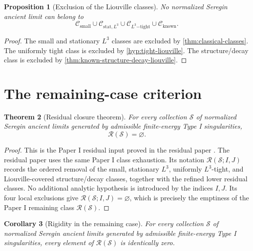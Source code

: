 \documentclass[11pt]{amsart}
\theoremstyle{plain}
\newtheorem{theorem}{Theorem}[section]
\newtheorem{proposition}[theorem]{Proposition}
\newtheorem{corollary}[theorem]{Corollary}
\theoremstyle{definition}
\theoremstyle{remark}
\numberwithin{equation}{section}
\newcommand{\calS}{\mathcal S}
\newcommand{\calR}{\mathcal R}
\newcommand{\calC}{\mathcal C}
\begin{document}
\begin{proposition}[Exclusion of the Liouville classes]
\label{prop:known-class-exclusion}
No normalized Seregin ancient limit can belong to
\[
   \calC_{\mathrm{small}}
   \cup
   \calC_{\mathrm{stat},L^3}
   \cup
   \calC_{L^3\mathrm{-tight}}
   \cup
   \calC_{\mathrm{known}}.
\]
\end{proposition}

\begin{proof}
The small and stationary \(L^3\) classes are excluded by
\cref{thm:classical-classes}.  The uniformly tight class is excluded by
\cref{hyp:tight-liouville}.  The structure/decay class is excluded by
\cref{thm:known-structure-decay-liouville}.
\end{proof}

\section{The remaining-case criterion}\label{sec:criterion}

\begin{theorem}[Residual closure theorem]\label{hyp:no-remainder}
For every collection \(\calS\) of normalized Seregin ancient limits generated
by admissible finite-energy Type I singularities,
\[
   \calR(\calS)=\varnothing .
\]
\end{theorem}

\begin{proof}
This is the Paper I residual input proved in the residual paper
\cite[Corollary~\emph{Paper I residual input}]
{DuranResidual2026}.  The residual paper uses the same Paper I class
exhaustion.  Its notation \(\calR(\calS;I,J)\) records the ordered removal of
the small, stationary \(L^3\), uniformly \(L^3\)-tight, and Liouville-covered
structure/decay classes, together with the refined lower residual classes.  No
additional analytic hypothesis is introduced by the indices \(I,J\).  Its four
local exclusions give \(\calR(\calS;I,J)=\varnothing\), which is precisely the
emptiness of the Paper I remaining class \(\calR(\calS)\).
\end{proof}

\begin{corollary}[Rigidity in the remaining case]\label{hyp:remainder-rigidity}
For every collection \(\calS\) of normalized Seregin ancient limits generated
by admissible finite-energy Type I singularities, every element of
\(\calR(\calS)\) is identically zero.
\end{corollary}
\end{document}
